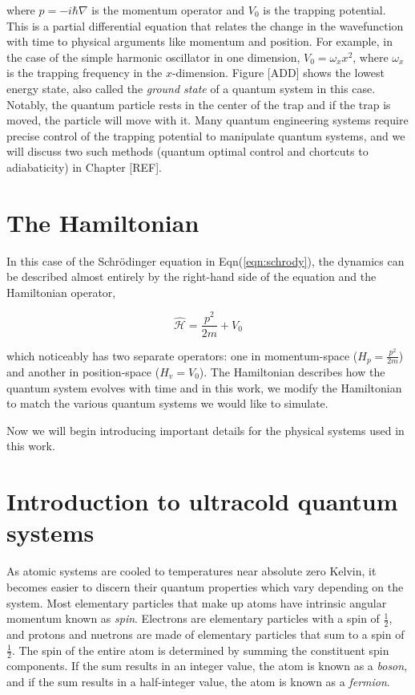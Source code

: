 where $p = -i\hbar\nabla$ is the momentum operator and $V_0$ is the trapping potential.
This is a partial differential equation that relates the change in the wavefunction with time to physical arguments like momentum and position.
For example, in the case of the simple harmonic oscillator in one dimension, $V_0 = \omega_x x^2$, where $\omega_x$ is the trapping frequency in the $x$-dimension.
Figure [ADD] shows the lowest energy state, also called the \textit{ground state} of a quantum system in this case.
Notably, the quantum particle rests in the center of the trap and if the trap is moved, the particle will move with it.
Many quantum engineering systems require precise control of the trapping potential to manipulate quantum systems, and we will discuss two such methods (quantum optimal control and chortcuts to adiabaticity) in Chapter [REF].

\section{The Hamiltonian}

In this case of the Schr\"odinger equation in Eqn(\ref{eqn:schrody}), the dynamics can be described almost entirely by the right-hand side of the equation and the Hamiltonian operator,

\begin{equation}
\mathcal{\hat H} = \frac{p^2}{2m} + V_0
\end{equation}

which noticeably has two separate operators: one in momentum-space ($H_p = \frac{p^2}{2m}$) and another in position-space ($H_v = V_0$).
The Hamiltonian describes how the quantum system evolves with time and in this work, we modify the Hamiltonian to match the various quantum systems we would like to simulate.

Now we will begin introducing important details for the physical systems used in this work.

\section{Introduction to ultracold quantum systems}

As atomic systems are cooled to temperatures near absolute zero Kelvin, it becomes easier to discern their quantum properties which vary depending on the system.
Most elementary particles that make up atoms have intrinsic angular momentum known as \textit{spin}.
Electrons are elementary particles with a spin of $\frac{1}{2}$, and protons and nuetrons are made of elementary particles that sum to a spin of $\frac{1}{2}$.
The spin of the entire atom is determined by summing the constituent spin components.
If the sum results in an integer value, the atom is known as a \textit{boson}, and if the sum results in a half-integer value, the atom is known as a \textit{fermion}.

